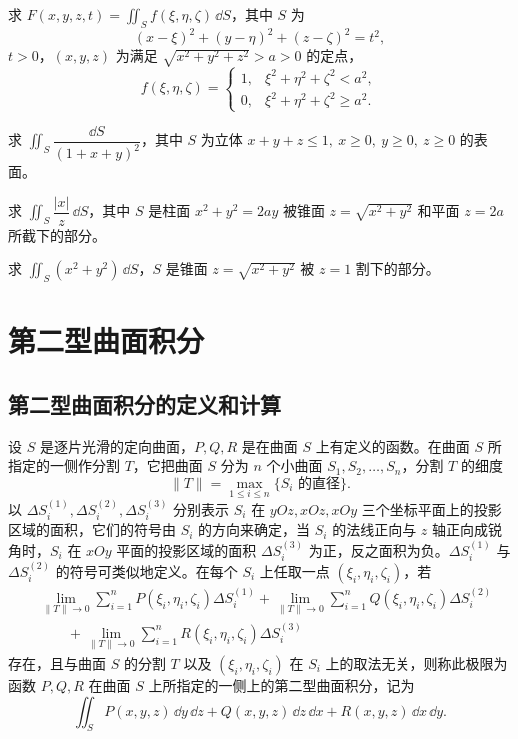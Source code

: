 \begin{xexercise}[8]
求 $F(x,y,z,t)=\iint_S f(\xi,\eta,\zeta)\,\dd S$，其中 $S$ 为
\[
  (x-\xi)^2+(y-\eta)^2+(z-\zeta)^2=t^2,
\]
$t>0$，$(x,y,z)$ 为满足 $\sqrt{x^2+y^2+z^2}>a>0$ 的定点，
\[
  f(\xi,\eta,\zeta)=
  \begin{cases}
  1,& \xi^2+\eta^2+\zeta^2<a^2,\\
  0,& \xi^2+\eta^2+\zeta^2\ge a^2.
  \end{cases}
\]
\end{xexercise}

\begin{xexercise}[9]
求 $\iint_S\dfrac{\dd S}{(1+x+y)^2}$，其中 $S$ 为立体 $x+y+z\le1,\ x\ge0,\ y\ge0,\ z\ge0$ 的表面。
\end{xexercise}

\begin{xexercise}[10]
求 $\iint_S\dfrac{|x|}{z}\,\dd S$，其中 $S$ 是柱面 $x^2+y^2=2ay$ 被锥面 $z=\sqrt{x^2+y^2}$ 和平面 $z=2a$ 所截下的部分。
\end{xexercise}

\begin{xexercise}[11]
求 $\iint_S(x^2+y^2)\,\dd S$，$S$ 是锥面 $z=\sqrt{x^2+y^2}$ 被 $z=1$ 割下的部分。
\end{xexercise}

\section{第二型曲面积分}

\subsection{第二型曲面积分的定义和计算}

设 $S$ 是逐片光滑的定向曲面，$P,Q,R$ 是在曲面 $S$ 上有定义的函数。在曲面 $S$ 所指定的一侧作分割 $T$，它把曲面 $S$ 分为 $n$ 个小曲面 $S_1,S_2,\ldots,S_n$，分割 $T$ 的细度
\[
  \|T\|=\max_{1\le i\le n}\{S_i\text{ 的直径}\}.
\]
以 $\Delta S_i^{(1)},\Delta S_i^{(2)},\Delta S_i^{(3)}$ 分别表示 $S_i$ 在 $yOz,xOz,xOy$ 三个坐标平面上的投影区域的面积，它们的符号由 $S_i$ 的方向来确定，当 $S_i$ 的法线正向与 $z$ 轴正向成锐角时，$S_i$ 在 $xOy$ 平面的投影区域的面积 $\Delta S_i^{(3)}$ 为正，反之面积为负。$\Delta S_i^{(1)}$ 与 $\Delta S_i^{(2)}$ 的符号可类似地定义。在每个 $S_i$ 上任取一点 $(\xi_i,\eta_i,\zeta_i)$，若
\begin{align*}
&\lim_{\|T\|\to0}\sum_{i=1}^nP(\xi_i,\eta_i,\zeta_i)\Delta S_i^{(1)}
+\lim_{\|T\|\to0}\sum_{i=1}^nQ(\xi_i,\eta_i,\zeta_i)\Delta S_i^{(2)}\\
&\qquad+\lim_{\|T\|\to0}\sum_{i=1}^nR(\xi_i,\eta_i,\zeta_i)\Delta S_i^{(3)}
\end{align*}
存在，且与曲面 $S$ 的分割 $T$ 以及 $(\xi_i,\eta_i,\zeta_i)$ 在 $S_i$ 上的取法无关，则称此极限为函数 $P,Q,R$ 在曲面 $S$ 上所指定的一侧上的第二型曲面积分，记为
\[
  \iint_S P(x,y,z)\,\dd y\,\dd z+Q(x,y,z)\,\dd z\,\dd x+R(x,y,z)\,\dd x\,\dd y.
\]

